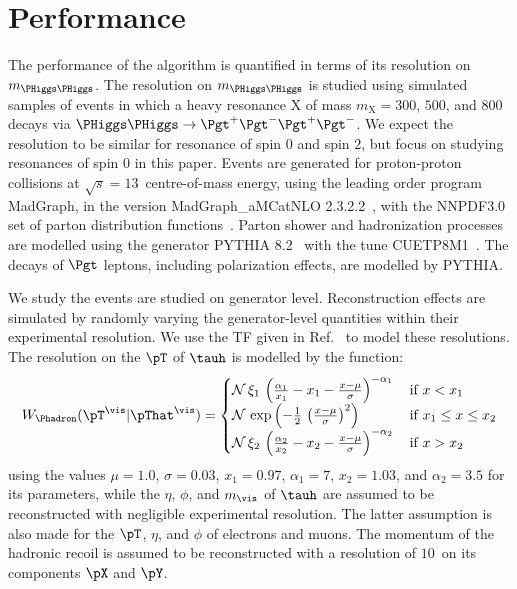 \section{Performance}
\label{sec:performance}

The performance of the algorithm is quantified in terms of its resolution on $m_{\PHiggs\PHiggs}$.
The resolution on $m_{\PHiggs\PHiggs}$ is studied using simulated samples of events
in which a heavy resonance $\textrm{X}$ of mass $m_{\textrm{X}} = 300$, $500$, and $800$~\GeV
decays via $\PHiggs\PHiggs \to \Pgt^{+}\Pgt^{-}\Pgt^{+}\Pgt^{-}$.
We expect the resolution to be similar for resonance of spin $0$ and spin $2$,
but focus on studying resonances of spin $0$ in this paper.
Events are generated for proton-proton collisions at $\sqrt{s} = 13$~\TeV centre-of-mass energy,
using the leading order program MadGraph, in the version MadGraph\_aMCatNLO 2.3.2.2~\cite{MadGraph_aMCatNLO},
with the NNPDF3.0 set of parton distribution functions~\cite{NNPDF1,NNPDF2,NNPDF3}.
Parton shower and hadronization processes are modelled using the generator PYTHIA 8.2~\cite{pythia8} with the tune CUETP8M1~\cite{PYTHIA_CUETP8M1tune_CMS}.
The decays of $\Pgt$ leptons, including polarization effects, are modelled by PYTHIA.

We study the events are studied on generator level.
Reconstruction effects are simulated by randomly varying the generator-level quantities within their experimental resolution.
We use the TF given in Ref.~\cite{SVfitMEM} to model these resolutions.
The resolution on the $\pT$ of $\tauh$ is modelled by the function:
\begin{equation}
W_{\Phadron}( \pT^{\vis} | \pThat^{\vis} ) = 
 \begin{cases}
   \mathcal{N} \, \xi_{1} \, \left( \frac{\alpha_{1}}{x_{1}} - x_{1} - \frac{x - \mu}{\sigma} \right)^{-\alpha_{1}} \,  
 & \mbox{if } x < x_{1} \\
   \mathcal{N} \, \exp\left( -\frac{1}{2} \, \left( \frac{x - \mu}{\sigma} \right)^{2} \right) \,
 & \mbox{if } x_{1} \leq x \leq x_{2} \\
   \mathcal{N} \, \xi_{2} \, \left( \frac{\alpha_{2}}{x_{2}} - x_{2} - \frac{x - \mu}{\sigma} \right)^{-\alpha_{2}} \,
 & \mbox{if } x > x_{2} 
 \end{cases}
\label{eq:tf_tauToHadDecays_pT}
\end{equation}
using the values $\mu = 1.0$, $\sigma = 0.03$, $x_{1} = 0.97$, $\alpha_{1} = 7$,
$x_{2} = 1.03$, and $\alpha_{2} = 3.5$ for its parameters,
while the $\eta$, $\phi$, and $m_{\vis}$ of $\tauh$ are assumed to be reconstructed with negligible experimental resolution.
The latter assumption is also made for the $\pT$, $\eta$, and $\phi$ of electrons and muons.
The momentum of the hadronic recoil is assumed to be reconstructed with a resolution of $10$~\GeV on its components $\pX$ and $\pY$.

